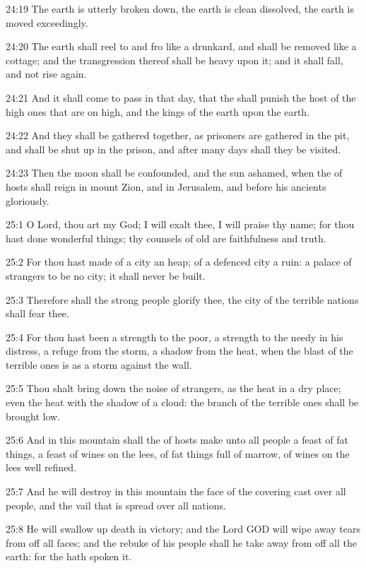 24:19 The earth is utterly broken down, the earth is clean dissolved, the earth is moved exceedingly.

24:20 The earth shall reel to and fro like a drunkard, and shall be removed like a cottage; and the transgression thereof shall be heavy upon it; and it shall fall, and not rise again.

24:21 And it shall come to pass in that day, that the \LORD shall punish the host of the high ones that are on high, and the kings of the earth upon the earth.

24:22 And they shall be gathered together, as prisoners are gathered in the pit, and shall be shut up in the prison, and after many days shall they be visited.

24:23 Then the moon shall be confounded, and the sun ashamed, when the \LORD of hosts shall reign in mount Zion, and in Jerusalem, and before his ancients gloriously.

25:1 O Lord, thou art my God; I will exalt thee, I will praise thy name; for thou hast done wonderful things; thy counsels of old are faithfulness and truth.

25:2 For thou hast made of a city an heap; of a defenced city a ruin: a palace of strangers to be no city; it shall never be built.

25:3 Therefore shall the strong people glorify thee, the city of the terrible nations shall fear thee.

25:4 For thou hast been a strength to the poor, a strength to the needy in his distress, a refuge from the storm, a shadow from the heat, when the blast of the terrible ones is as a storm against the wall.

25:5 Thou shalt bring down the noise of strangers, as the heat in a dry place; even the heat with the shadow of a cloud: the branch of the terrible ones shall be brought low.

25:6 And in this mountain shall the \LORD of hosts make unto all people a feast of fat things, a feast of wines on the lees, of fat things full of marrow, of wines on the lees well refined.

25:7 And he will destroy in this mountain the face of the covering cast over all people, and the vail that is spread over all nations.

25:8 He will swallow up death in victory; and the Lord GOD will wipe away tears from off all faces; and the rebuke of his people shall he take away from off all the earth: for the \LORD hath spoken it.

